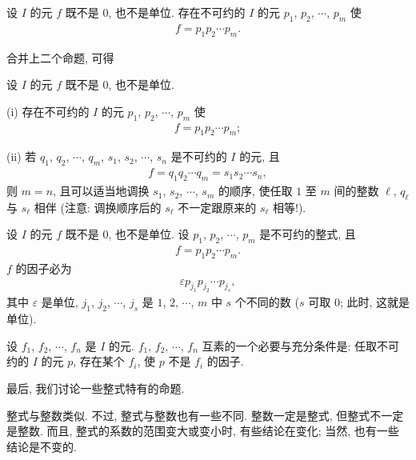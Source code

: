 \begin{proposition}
    设 $I$ 的元 $f$ 既不是 $0$, 也不是单位. 存在不可约的 $I$ 的元 $p_1$, $p_2$, $\cdots$, $p_m$ 使
    \begin{align*}
        f = p_1 p_2 \cdots p_m.
    \end{align*}
\end{proposition}

合并上二个命题, 可得
\begin{proposition}
    设 $I$ 的元 $f$ 既不是 $0$, 也不是单位.

    (i) 存在不可约的 $I$ 的元 $p_1$, $p_2$, $\cdots$, $p_m$ 使
    \begin{align*}
        f = p_1 p_2 \cdots p_m;
    \end{align*}

    (ii) 若 $q_1$, $q_2$, $\cdots$, $q_m$, $s_1$, $s_2$, $\cdots$, $s_n$ 是不可约的 $I$ 的元, 且
    \begin{align*}
        f = q_1 q_2 \cdots q_m = s_1 s_2 \cdots s_n,
    \end{align*}
    则 $m = n$, 且可以适当地调换 $s_1$, $s_2$, $\cdots$, $s_m$ 的顺序, 使任取 $1$ 至 $m$ 间的整数 $\ell$, $q_\ell$ 与 $s_\ell$ 相伴 (注意: 调换顺序后的 $s_\ell$ 不一定跟原来的 $s_\ell$ 相等!).
\end{proposition}

\begin{proposition}
    设 $I$ 的元 $f$ 既不是 $0$, 也不是单位. 设 $p_1$, $p_2$, $\cdots$, $p_m$ 是不可约的整式, 且
    \begin{align*}
        f = p_1 p_2 \cdots p_m.
    \end{align*}
    $f$ 的因子必为
    \begin{align*}
        \varepsilon p_{j_1} p_{j_2} \cdots p_{j_s},
    \end{align*}
    其中 $\varepsilon$ 是单位, $j_1$, $j_2$, $\cdots$, $j_s$ 是 $1$, $2$, $\cdots$, $m$ 中 $s$ 个不同的数 ($s$ 可取 $0$; 此时, 这就是单位).
\end{proposition}

\begin{proposition}
    设 $f_1$, $f_2$, $\cdots$, $f_n$ 是 $I$ 的元. $f_1$, $f_2$, $\cdots$, $f_n$ 互素的一个必要与充分条件是: 任取不可约的 $I$ 的元 $p$, 存在某个 $f_i$, 使 $p$ 不是 $f_i$ 的因子.
\end{proposition}

\myLine

最后, 我们讨论一些整式特有的命题.

整式与整数类似. 不过, 整式与整数也有一些不同. 整数一定是整式, 但整式不一定是整数. 而且, 整式的系数的范围变大或变小时, 有些结论在变化; 当然, 也有一些结论是不变的.

